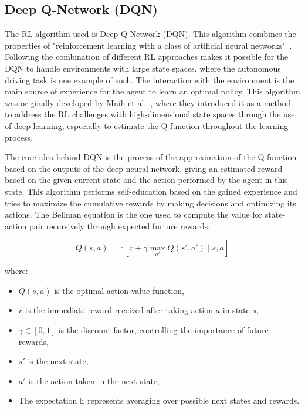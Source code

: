 \subsection{Deep Q-Network (DQN)}\label{sec:dqn}

The RL algorithm used is Deep Q-Network (DQN). This algorithm combines the properties of "reinforcement learning with a class of artificial neural networks"~\cite{mnih2015human}. Following the combination of different RL approaches makes it possible for the DQN to handle environments with large state spaces, where the autonomous driving task is one example of such. The interaction with the environment is the main source of experience for the agent to learn an optimal policy. This algorithm was originally developed by Mnih et al.~\cite{mnih2015human}, where they introduced it as a method to address the RL challenges with high-dimensional state spaces through the use of deep learning, especially to estimate the Q-function throughout the learning process.

The core idea behind DQN is the process of the approximation of the Q-function based on the outputs of the deep neural network, giving an estimated reward based on the given current state and the action performed by the agent in this state. This algorithm performs self-education based on the gained experience and tries to maximize the cumulative rewards by making decisions and optimizing its actions. The Bellman equation is the one used to compute the value for state-action pair recursively through expected furture rewards:

\begin{equation}
    Q(s, a) = \mathbb{E} \left[ r + \gamma \max_{a'} Q(s', a') \mid s, a \right]
    \label{eq:bellman}
\end{equation}

where:
\begin{itemize}
    \item $Q(s, a)$ is the optimal action-value function,
    \item $r$ is the immediate reward received after taking action $a$ in state $s$,
    \item $\gamma \in [0,1]$ is the discount factor, controlling the importance of future rewards,
    \item $s'$ is the next state,
    \item $a'$ is the action taken in the next state,
    \item The expectation $\mathbb{E}$ represents averaging over possible next states and rewards.
\end{itemize}

